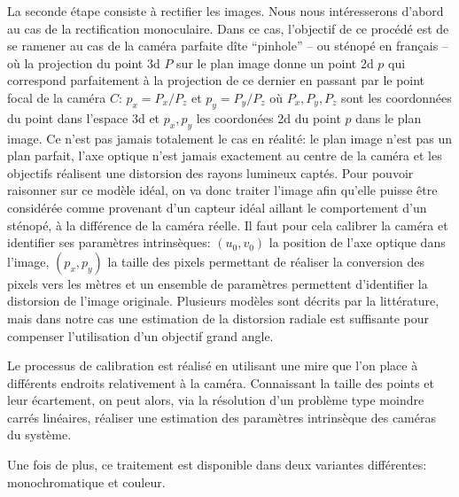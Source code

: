 La seconde étape consiste à rectifier les images. Nous nous
intéresserons d'abord au cas de la rectification
monoculaire. Dans ce cas, l'objectif de ce procédé est de se ramener
au cas de la caméra parfaite dîte
``pinhole'' -- ou sténopé en français -- où la projection
du point 3d $P$ sur le plan image donne un point 2d $p$ qui correspond
parfaitement à la projection de ce dernier en passant par le point
focal de la caméra $C$: $p_x = P_x / P_z$ et $p_y = P_y / P_z$ où
$P_x, P_y, P_z$ sont les coordonnées du point dans l'espace 3d et
$p_x, p_y$ les coordonées 2d du point $p$ dans le plan image. Ce n'est
pas jamais totalement le cas en réalité: le plan image n'est pas un
plan parfait, l'axe optique n'est jamais exactement au centre de la
caméra et les objectifs réalisent une distorsion des
rayons lumineux captés. Pour pouvoir raisonner sur ce modèle idéal, on
va donc traiter l'image afin qu'elle puisse être considérée comme
provenant d'un capteur idéal aillant le comportement d'un sténopé, à
la différence de la caméra réelle. Il faut pour cela calibrer la
caméra et identifier ses paramètres intrinsèques: $(u_0, v_0)$ la position de l'axe optique
dans l'image, $(p_x, p_y)$ la taille des pixels permettant de réaliser
la conversion des pixels vers les mètres et un ensemble de paramètres
permettent d'identifier la distorsion de l'image originale. Plusieurs
modèles sont décrits par la littérature, mais dans notre cas une
estimation de la distorsion radiale est
suffisante pour compenser l'utilisation d'un objectif grand angle.


Le processus de calibration est réalisé en utilisant une mire que l'on
place à différents endroits relativement à la caméra. Connaissant la
taille des points et leur écartement, on peut alors, via la résolution
d'un problème type moindre carrés linéaires, réaliser une estimation
des paramètres intrinsèque des caméras du système.

Une fois de plus, ce traitement est disponible dans deux variantes
différentes: monochromatique et couleur.

